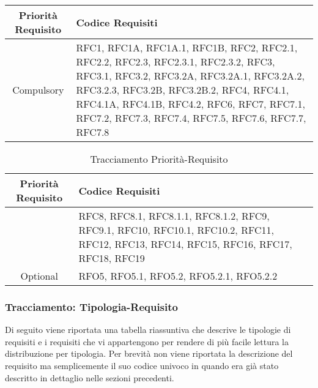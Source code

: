 \begin{table}[!htbp] %
            \centering
            \renewcommand{\arraystretch}{2} %
            \begin{tabular}{|c|p{2cm}|} %
                \rowcolor{orange!50} %
        		\hline
        		\textbf{Priorità Requisito} & \textbf{Codice Requisiti} \\
                \hline
                Compulsory & RFC1, RFC1A, RFC1A.1, RFC1B, RFC2, RFC2.1, RFC2.2, RFC2.3, RFC2.3.1, RFC2.3.2, RFC3, RFC3.1, RFC3.2, RFC3.2A, RFC3.2A.1, RFC3.2A.2, RFC3.2.3, RFC3.2B, RFC3.2B.2, RFC4, RFC4.1, RFC4.1A, RFC4.1B, RFC4.2, RFC6, RFC7, RFC7.1, RFC7.2, RFC7.3, RFC7.4, RFC7.5, RFC7.6, RFC7.7, RFC7.8\\
                \hline
            \end{tabular}
\end{table}
\begin{table}[!htbp] %
            \centering
            \renewcommand{\arraystretch}{2} %
            \begin{tabular}{|c|p{2cm}|} %
                \rowcolor{orange!50} %
        		\hline
        		\textbf{Priorità Requisito} & \textbf{Codice Requisiti} \\
                \hline
                & RFC8, RFC8.1, RFC8.1.1, RFC8.1.2, RFC9, RFC9.1, RFC10, RFC10.1, RFC10.2, RFC11, RFC12, RFC13, RFC14, RFC15, RFC16, RFC17, RFC18, RFC19\\
                \hline
                Optional & RFO5, RFO5.1, RFO5.2, RFO5.2.1, RFO5.2.2\\
                \hline
        \end{tabular}
        \caption{Tracciamento Priorità-Requisito} %
\end{table}
\newpage
\subsubsection{Tracciamento: Tipologia-Requisito}
Di seguito viene riportata una tabella riassuntiva che descrive le tipologie di requisiti e i requisiti che vi appartengono per rendere di più facile lettura la distribuzione per tipologia.
Per brevità non viene riportata la descrizione del requisito ma semplicemente il suo codice univoco in quando era già stato descritto in dettaglio nelle sezioni precedenti.

